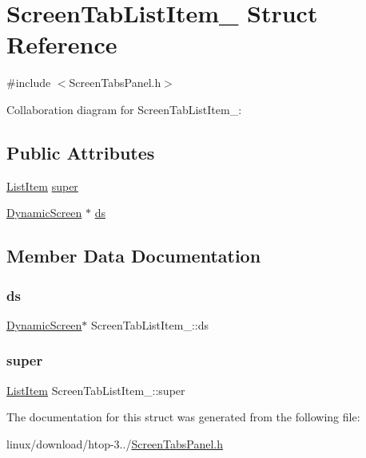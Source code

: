 \hypertarget{structScreenTabListItem__}{}\section{Screen\+Tab\+List\+Item\+\_\+ Struct Reference}
\label{structScreenTabListItem__}


{\ttfamily \#include $<$Screen\+Tabs\+Panel.\+h$>$}



Collaboration diagram for Screen\+Tab\+List\+Item\+\_\+\+:
\subsection*{Public Attributes}
\begin{DoxyCompactItemize}
\item 
\hyperlink{ListItem_8h_a311dfe5c572117175446997a9e6f15b8}{List\+Item} \hyperlink{structScreenTabListItem___a5f3c200b83952a678c8d4c37c1e94232}{super}
\item 
\hyperlink{DynamicScreen_8h_a9b10b5a0b32fbb6fe6af7f0571ae6b25}{Dynamic\+Screen} $\ast$ \hyperlink{structScreenTabListItem___a01532156af3735f65189467b2cbd3d66}{ds}
\end{DoxyCompactItemize}


\subsection{Member Data Documentation}
\mbox{\label{structScreenTabListItem___a01532156af3735f65189467b2cbd3d66}} 
\subsubsection{\texorpdfstring{ds}{ds}}
{\footnotesize\ttfamily \hyperlink{DynamicScreen_8h_a9b10b5a0b32fbb6fe6af7f0571ae6b25}{Dynamic\+Screen}$\ast$ Screen\+Tab\+List\+Item\+\_\+\+::ds}

\mbox{\label{structScreenTabListItem___a5f3c200b83952a678c8d4c37c1e94232}} 
\subsubsection{\texorpdfstring{super}{super}}
{\footnotesize\ttfamily \hyperlink{ListItem_8h_a311dfe5c572117175446997a9e6f15b8}{List\+Item} Screen\+Tab\+List\+Item\+\_\+\+::super}



The documentation for this struct was generated from the following file\+:\begin{DoxyCompactItemize}
\item 
linux/download/htop-\/3../\hyperlink{ScreenTabsPanel_8h}{Screen\+Tabs\+Panel.\+h}\end{DoxyCompactItemize}
